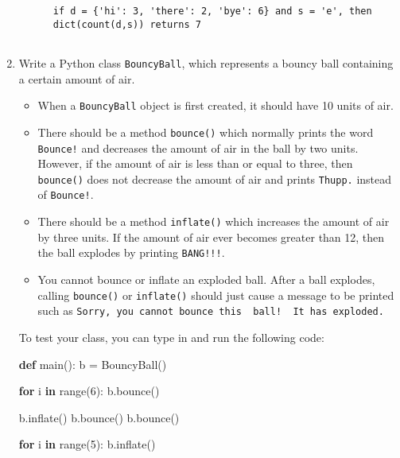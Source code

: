 \documentclass[]{article}
\newenvironment{Shaded}{}{}
\newcommand{\BuiltInTok}[1]{#1}
\newcommand{\ControlFlowTok}[1]{\textcolor[rgb]{0.00,0.44,0.13}{\textbf{#1}}}
\newcommand{\DecValTok}[1]{\textcolor[rgb]{0.25,0.63,0.44}{#1}}
\newcommand{\KeywordTok}[1]{\textcolor[rgb]{0.00,0.44,0.13}{\textbf{#1}}}
\newcommand{\NormalTok}[1]{#1}
\newcommand{\OperatorTok}[1]{\textcolor[rgb]{0.40,0.40,0.40}{#1}}
\providecommand{\tightlist}{%
  \setlength{\itemsep}{0pt}\setlength{\parskip}{0pt}}
\begin{document}
\begin{enumerate}
\begin{verbatim}
      if d = {'hi': 3, 'there': 2, 'bye': 6} and s = 'e', then
      dict(count(d,s)) returns 7
      
    \end{verbatim}



\def\labelenumi{\arabic{enumi}.}
\item
  Write a Python class \texttt{BouncyBall}, which represents a bouncy
  ball containing a certain amount of air.

  \begin{itemize}
  \tightlist
  \item
    When a \texttt{BouncyBall} object is first created, it should have
    10 units of air.
  \item
    There should be a method \texttt{bounce()} which normally prints the
    word \texttt{Bounce!} and decreases the amount of air in the ball by
    two units. However, if the amount of air is less than or equal to
    three, then \texttt{bounce()} does not decrease the amount of air
    and prints \texttt{Thupp.} instead of \texttt{Bounce!}.
  \item
    There should be a method \texttt{inflate()} which increases the
    amount of air by three units. If the amount of air ever becomes
    greater than 12, then the ball explodes by printing
    \texttt{BANG!!!}.
  \item
    You cannot bounce or inflate an exploded ball. After a ball
    explodes, calling \texttt{bounce()} or \texttt{inflate()} should
    just cause a message to be printed such as
    \texttt{Sorry,\ you\ cannot\ bounce\ this\ \ ball!\ \ It\ has\ exploded.}
  \end{itemize}

  To test your class, you can type in and run the following code:

\begin{Shaded}
\begin{Highlighting}[]
\KeywordTok{def}\NormalTok{ main():}
\NormalTok{    b }\OperatorTok{=}\NormalTok{ BouncyBall()}

    \ControlFlowTok{for}\NormalTok{ i }\KeywordTok{in} \BuiltInTok{range}\NormalTok{(}\DecValTok{6}\NormalTok{):}
\NormalTok{        b.bounce()}

\NormalTok{    b.inflate()}
\NormalTok{    b.bounce()}
\NormalTok{    b.bounce()}

    \ControlFlowTok{for}\NormalTok{ i }\KeywordTok{in} \BuiltInTok{range}\NormalTok{(}\DecValTok{5}\NormalTok{):}
\NormalTok{        b.inflate()}


\end{Highlighting}
\end{Shaded}
\end{enumerate}
\end{document}
